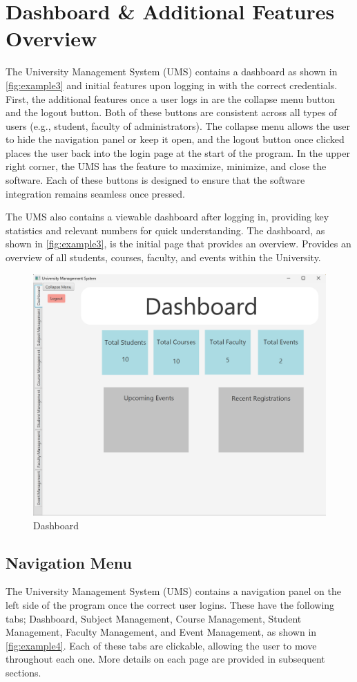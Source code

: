 \newpage
\section{Dashboard \& Additional Features Overview}
The University Management System (UMS) contains a dashboard as shown in \autoref{fig:example3} and initial features upon logging in with the correct credentials. First, the additional features once a user logs in are the collapse menu button and the logout button. Both of these buttons are consistent across all types of users (e.g., student, faculty of administrators). The collapse menu allows the user to hide the navigation panel or keep it open, and the logout button once clicked places the user back into the login page at the start of the program. In the upper right corner, the UMS has the feature to maximize, minimize, and close the software. Each of these buttons is designed to ensure that the software integration remains seamless once pressed.


The UMS also contains a viewable dashboard after logging in, providing key statistics and relevant numbers for quick understanding. The dashboard, as shown in \autoref{fig:example3}, is the initial page that provides an overview. Provides an overview of all students, courses, faculty, and events within the University.


\begin{figure}[ht]
    \centering
        \centering\includegraphics[width=0.7\linewidth]{figures/Dashboard.png}
        \caption{Dashboard}
        \label{fig:example3}  
\end{figure}



\newpage
\subsection{Navigation Menu}
The University Management System (UMS) contains a navigation panel on the left side of the program once the correct user logins. These have the following tabs; Dashboard, Subject Management, Course Management, Student Management, Faculty Management, and Event Management, as shown in \autoref{fig:example4}. Each of these tabs are clickable, allowing the user to move throughout each one. More details on each page are provided in subsequent sections. 

